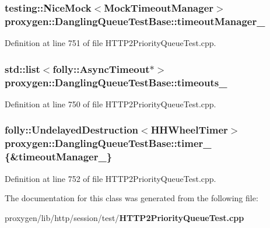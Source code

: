 \subsubsection[{timeout\+Manager\+\_\+}]{\setlength{\rightskip}{0pt plus 5cm}testing\+::\+Nice\+Mock$<$Mock\+Timeout\+Manager$>$ proxygen\+::\+Dangling\+Queue\+Test\+Base\+::timeout\+Manager\+\_\+\hspace{0.3cm}{\ttfamily [protected]}}\label{classproxygen_1_1DanglingQueueTestBase_a524fa9fbf6ecb1e83e3d5fa7429c8905}


Definition at line 751 of file H\+T\+T\+P2\+Priority\+Queue\+Test.\+cpp.

\subsubsection[{timeouts\+\_\+}]{\setlength{\rightskip}{0pt plus 5cm}std\+::list$<$folly\+::\+Async\+Timeout$\ast$$>$ proxygen\+::\+Dangling\+Queue\+Test\+Base\+::timeouts\+\_\+\hspace{0.3cm}{\ttfamily [protected]}}\label{classproxygen_1_1DanglingQueueTestBase_ad591bb3840b23d95d7af977604868ca3}


Definition at line 750 of file H\+T\+T\+P2\+Priority\+Queue\+Test.\+cpp.

\subsubsection[{timer\+\_\+}]{\setlength{\rightskip}{0pt plus 5cm}folly\+::\+Undelayed\+Destruction$<$H\+H\+Wheel\+Timer$>$ proxygen\+::\+Dangling\+Queue\+Test\+Base\+::timer\+\_\+ \{\&{\bf timeout\+Manager\+\_\+}\}\hspace{0.3cm}{\ttfamily [protected]}}\label{classproxygen_1_1DanglingQueueTestBase_ac65c387cda8f4586a75684bf908499b1}


Definition at line 752 of file H\+T\+T\+P2\+Priority\+Queue\+Test.\+cpp.



The documentation for this class was generated from the following file\+:\begin{DoxyCompactItemize}
\item 
proxygen/lib/http/session/test/{\bf H\+T\+T\+P2\+Priority\+Queue\+Test.\+cpp}\end{DoxyCompactItemize}
